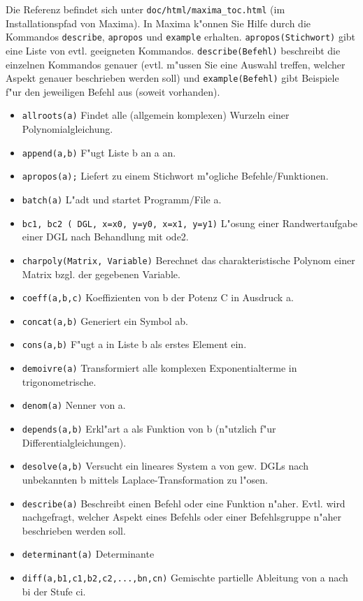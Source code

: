 \documentclass[spanish,12pt,a4paper]{article}
\begin{document}
Die Referenz befindet sich unter \verb|doc/html/maxima_toc.html| (im Installationspfad von Maxima). In Maxima k"onnen Sie Hilfe durch die Kommandos \verb|describe|, \verb|apropos| und \verb|example| erhalten. \verb|apropos(Stichwort)| gibt eine Liste von evtl. geeigneten Kommandos. \verb|describe(Befehl)| beschreibt die einzelnen Kommandos genauer (evtl. m"ussen Sie eine Auswahl treffen, welcher Aspekt genauer beschrieben werden soll) und \verb|example(Befehl)| gibt Beispiele f"ur den jeweiligen Befehl aus (soweit vorhanden).

\begin{itemize}
\item \verb|allroots(a)| Findet alle (allgemein komplexen) Wurzeln einer Polynomialgleichung.
\item \verb|append(a,b)| F"ugt Liste b an a an.
\item \verb|apropos(a);| Liefert zu einem Stichwort m"ogliche Befehle/Funktionen.
\item \verb|batch(a)| L"adt und startet Programm/File a.
\item \verb|bc1, bc2 ( DGL, x=x0, y=y0, x=x1, y=y1)| L"osung einer Randwertaufgabe einer DGL nach Behandlung mit ode2.
\item \verb|charpoly(Matrix, Variable)| Berechnet das charakteristische Polynom einer Matrix bzgl. der gegebenen Variable.
\item \verb|coeff(a,b,c)| Koeffizienten von b der Potenz C in Ausdruck a.
\item \verb|concat(a,b)| Generiert ein Symbol ab.
\item \verb|cons(a,b)| F"ugt a in Liste b als erstes Element ein.
\item \verb|demoivre(a)| Transformiert alle komplexen Exponentialterme in trigonometrische.
\item \verb|denom(a)| Nenner von a.
\item \verb|depends(a,b)| Erkl"art a als Funktion von b (n"utzlich f"ur Differentialgleichungen).
\item \verb|desolve(a,b)| Versucht ein lineares System a von gew. DGLs nach unbekannten b mittels Laplace-Transformation zu l"osen.
\item \verb|describe(a)| Beschreibt einen Befehl oder eine Funktion n"aher. Evtl. wird nachgefragt, welcher Aspekt eines Befehls oder einer Befehlsgruppe n"aher beschrieben werden soll.
\item \verb|determinant(a)| Determinante
\item \verb|diff(a,b1,c1,b2,c2,...,bn,cn)| Gemischte partielle Ableitung von a nach bi der Stufe ci.

\end{itemize}
\end{document}

